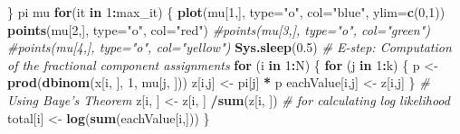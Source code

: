 \documentclass[]{article}
\newenvironment{Shaded}{\begin{snugshade}}{\end{snugshade}}
\newcommand{\KeywordTok}[1]{\textcolor[rgb]{0.13,0.29,0.53}{\textbf{#1}}}
\newcommand{\DataTypeTok}[1]{\textcolor[rgb]{0.13,0.29,0.53}{#1}}
\newcommand{\DecValTok}[1]{\textcolor[rgb]{0.00,0.00,0.81}{#1}}
\newcommand{\FloatTok}[1]{\textcolor[rgb]{0.00,0.00,0.81}{#1}}
\newcommand{\StringTok}[1]{\textcolor[rgb]{0.31,0.60,0.02}{#1}}
\newcommand{\CommentTok}[1]{\textcolor[rgb]{0.56,0.35,0.01}{\textit{#1}}}
\newcommand{\ControlFlowTok}[1]{\textcolor[rgb]{0.13,0.29,0.53}{\textbf{#1}}}
\newcommand{\OperatorTok}[1]{\textcolor[rgb]{0.81,0.36,0.00}{\textbf{#1}}}
\newcommand{\NormalTok}[1]{#1}
\begin{document}
\begin{Shaded}
\begin{Highlighting}[]
{\NormalTok{\}}
\NormalTok{pi}
\NormalTok{mu}
\ControlFlowTok{for}\NormalTok{(it }\ControlFlowTok{in} \DecValTok{1}\OperatorTok{:}\NormalTok{max_it) \{}
\KeywordTok{plot}\NormalTok{(mu[}\DecValTok{1}\NormalTok{,], }\DataTypeTok{type=}\StringTok{"o"}\NormalTok{, }\DataTypeTok{col=}\StringTok{"blue"}\NormalTok{, }\DataTypeTok{ylim=}\KeywordTok{c}\NormalTok{(}\DecValTok{0}\NormalTok{,}\DecValTok{1}\NormalTok{))}
\KeywordTok{points}\NormalTok{(mu[}\DecValTok{2}\NormalTok{,], }\DataTypeTok{type=}\StringTok{"o"}\NormalTok{, }\DataTypeTok{col=}\StringTok{"red"}\NormalTok{)}
\CommentTok{#points(mu[3,], type="o", col="green")}
\CommentTok{#points(mu[4,], type="o", col="yellow")}
\KeywordTok{Sys.sleep}\NormalTok{(}\FloatTok{0.5}\NormalTok{)}
\CommentTok{# E-step: Computation of the fractional component assignments}
\ControlFlowTok{for}\NormalTok{ (i }\ControlFlowTok{in} \DecValTok{1}\OperatorTok{:}\NormalTok{N) \{}
\ControlFlowTok{for}\NormalTok{ (j }\ControlFlowTok{in} \DecValTok{1}\OperatorTok{:}\NormalTok{k) \{}
\NormalTok{p <-}\StringTok{ }\KeywordTok{prod}\NormalTok{(}\KeywordTok{dbinom}\NormalTok{(x[i, ], }\DecValTok{1}\NormalTok{, mu[j, ]))}
\NormalTok{z[i,j] <-}\StringTok{ }\NormalTok{pi[j] }\OperatorTok{*}\StringTok{ }\NormalTok{p}
\NormalTok{eachValue[i,j] <-}\StringTok{ }\NormalTok{z[i,j]}
\NormalTok{\}}
\CommentTok{# Using Baye's Theorem}
\NormalTok{z[i, ] <-}\StringTok{ }\NormalTok{z[i, ] }\OperatorTok{/}\KeywordTok{sum}\NormalTok{(z[i, ])}
\CommentTok{# for calculating log likelihood}
\NormalTok{total[i] <-}\StringTok{ }\KeywordTok{log}\NormalTok{(}\KeywordTok{sum}\NormalTok{(eachValue[i,]))}
\NormalTok{\}}

}
\end{Highlighting}
\end{Shaded}
\end{document}
